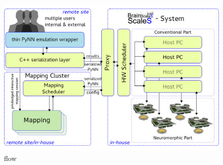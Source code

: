 \documentclass[11pt, a4paper, DIV=11]{scrartcl}
\begin{document}
\begin{figure}[h]
    \begin{center}
        \includegraphics[width=\textwidth]{fig/flow.png}
    \end{center}
    \caption{flow}
    \label{fig:flow}
\end{figure}

%
%

\begin{acronym}
\end{acronym}
\end{document}
